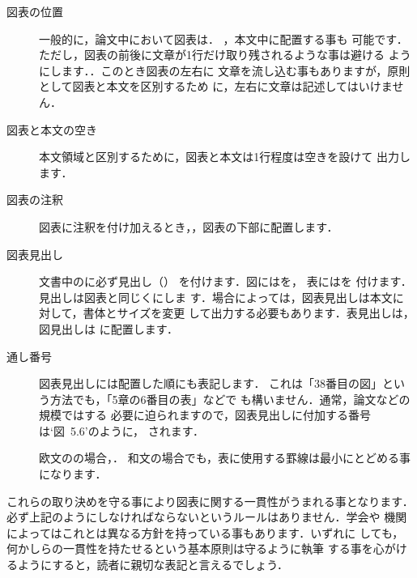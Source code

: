 \begin{description}
\item[図表の位置] 
 一般的に，論文中において図表は．
 ，本文中に配置する事も
 可能です．ただし，図表の前後に文章が1行だけ取り残されるような事は避ける
 ようにします．．このとき図表の左右に
 文章を流し込む事もありますが，原則として図表と本文を区別するため
 に，左右に文章は記述してはいけません．

\item[図表と本文の空き] 
 本文領域と区別するために，図表と本文は1行程度は空きを設けて
 出力します．

\item[図表の注釈] 
 図表に注釈を付け加えるとき，，図表の下部に配置します．

\item[図表見出し] 
 文書中のに必ず見出し（）
 を付けます．図にはを， 表にはを
 付けます．見出しは図表と同じくにしま
 す．場合によっては，図表見出しは本文に対して，書体とサイズを変更
 して出力する必要もあります．表見出しは，図見出しは
 に配置します．

\item[通し番号] 
 図表見出しには配置した順にも表記します．
 これは「38番目の図」という方法でも，「5章の6番目の表」などで
 も構いません．通常，論文などの規模ではする
 必要に迫られますので，図表見出しに付加する番号は`図~5.6'のように，
 されます．

\item[] 
 欧文のの場合，．
 和文の場合でも，表に使用する罫線は最小にとどめる事になります．
\end{description}

これらの取り決めを守る事により図表に関する一貫性がうまれる事となります．
必ず上記のようにしなければならないというルールはありません．学会や
機関によってはこれとは異なる方針を持っている事もあります．いずれに
しても，何かしらの一貫性を持たせるという基本原則は守るように執筆
する事を心がけるようにすると，読者に親切な表記と言えるでしょう．

